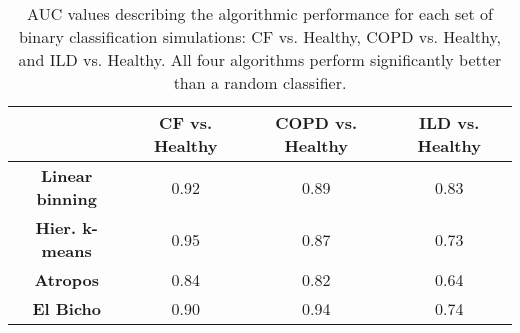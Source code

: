 
\begin{table}[!htb]
 \centering
 \begin{tabular*}{0.95\textwidth}{c c c c}
   \toprule
   {} & {\bf CF vs. Healthy} & {\bf COPD vs. Healthy} & {\bf ILD vs. Healthy} \\
   \hline
   {\bf Linear binning} & 0.92  &  0.89  &  0.83  \\
   {\bf Hier. k-means} & 0.95  &  0.87  &  0.73  \\
   {\bf Atropos} &  0.84  &  0.82  &  0.64  \\
   {\bf El Bicho} &  0.90  &  0.94  &  0.74  \\
   \hline
   \bottomrule
   \end{tabular*}
 \caption{AUC values describing the algorithmic performance for each set of binary
          classification simulations: CF vs. Healthy, COPD vs. Healthy, and
          ILD vs. Healthy.  All four algorithms perform significantly better than a
          random classifier.
          }
 \label{table:auc}
\end{table}
